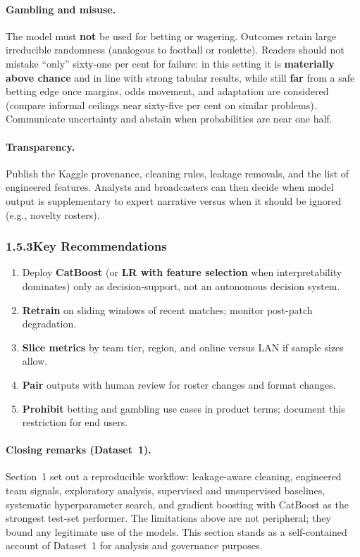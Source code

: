\documentclass[12pt,a4paper]{article}
\begin{document}
\paragraph{Gambling and misuse.}
The model must \textbf{not} be used for betting or wagering. Outcomes retain large irreducible randomness (analogous to football or roulette). Readers should not mistake ``only'' sixty-one per cent for failure: in this setting it is \textbf{materially above chance} and in line with strong tabular results, while still \textbf{far} from a safe betting edge once margins, odds movement, and adaptation are considered (compare informal ceilings near sixty-five per cent on similar problems). Communicate uncertainty and abstain when probabilities are near one half.

\paragraph{Transparency.}
Publish the Kaggle provenance, cleaning rules, leakage removals, and the list of engineered features. Analysts and broadcasters can then decide when model output is supplementary to expert narrative versus when it should be ignored (e.g., novelty rosters).

\subsubsection{1.5.3\quad Key Recommendations}

\begin{enumerate}[leftmargin=1.5em]
    \item Deploy \textbf{CatBoost} (or \textbf{LR with feature selection} when interpretability dominates) only as decision-support, not an autonomous decision system.
    \item \textbf{Retrain} on sliding windows of recent matches; monitor post-patch degradation.
    \item \textbf{Slice metrics} by team tier, region, and online versus LAN if sample sizes allow.
    \item \textbf{Pair} outputs with human review for roster changes and format changes.
    \item \textbf{Prohibit} betting and gambling use cases in product terms; document this restriction for end users.
\end{enumerate}

\paragraph{Closing remarks (Dataset~1).}
Section~1 set out a reproducible workflow: leakage-aware cleaning, engineered team signals, exploratory analysis, supervised and unsupervised baselines, systematic hyperparameter search, and gradient boosting with CatBoost as the strongest test-set performer. The limitations above are not peripheral; they bound any legitimate use of the models. This section stands as a self-contained account of Dataset~1 for analysis and governance purposes.
\end{document}
